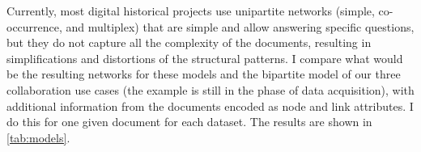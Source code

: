 

Currently, most digital historical projects use unipartite networks (simple, co-occurrence, and multiplex) that are simple and allow answering specific questions, but they do not capture all the complexity of the documents, resulting in simplifications and distortions of the structural patterns.
I compare what would be the resulting networks for these models and the bipartite model of our three collaboration use cases (the example \dana is still in the phase of data acquisition), with additional information from the documents encoded as node and link attributes.
I do this for one given document for each dataset.
The results are shown in \autoref{tab:models}.

